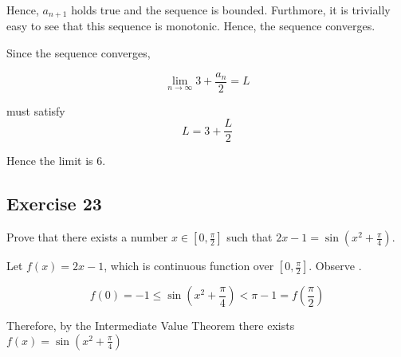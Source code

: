 \documentclass{tufte-book}
\theoremstyle{mytheoremstyle}
\theoremstyle{mylemstyle}
\theoremstyle{mydefstyle}
\begin{document}
Hence, $a_{n+1}$ holds true and the sequence is bounded.  Furthmore, it is trivially easy to see that this sequence is monotonic.  Hence, the sequence converges.

Since the sequence converges,

\[ \lim_{n \to \infty} 3 + \frac{a_n}{2} = L \]

must satisfy
\[ L = 3 + \frac{L}{2} \]

Hence the limit is $6$.

\subsection{Exercise 23}
Prove that there exists a number $x \in [0, \frac{\pi}{2}]$ such that $2x-1 =
\sin(x^2 + \frac{\pi}{4})$.

Let $f(x) = 2x - 1$, which is continuous function over $[0, \frac{\pi}{2}]$.  Observe .

\[ f(0) = -1 \leq \sin(x^2 + \frac{\pi}{4}) < \pi - 1 = f(\frac{\pi}{2}) \]

Therefore, by the Intermediate Value Theorem there exists $f(x) = \sin(x^2 + \frac{\pi}{4})$
\end{document}
